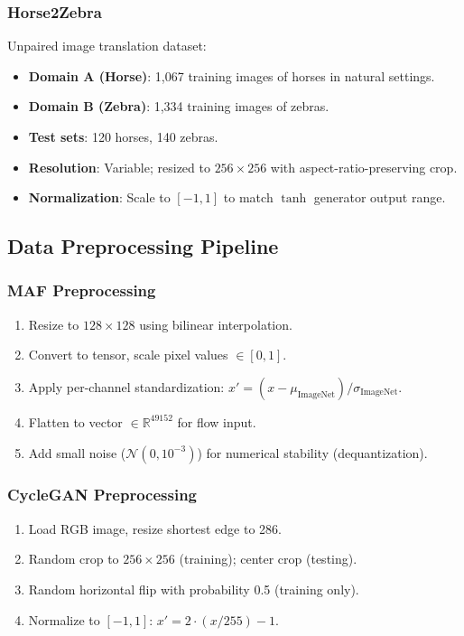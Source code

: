 \documentclass[11pt]{article}
\begin{document}
\subsubsection{Horse2Zebra}
Unpaired image translation dataset:
\begin{itemize}
\item \textbf{Domain A (Horse)}: 1,067 training images of horses in natural settings.
\item \textbf{Domain B (Zebra)}: 1,334 training images of zebras.
\item \textbf{Test sets}: 120 horses, 140 zebras.
\item \textbf{Resolution}: Variable; resized to $256 \times 256$ with aspect-ratio-preserving crop.
\item \textbf{Normalization}: Scale to $[-1, 1]$ to match $\tanh$ generator output range.
\end{itemize}

\subsection{Data Preprocessing Pipeline}
\subsubsection{MAF Preprocessing}
\begin{enumerate}
\item Resize to $128 \times 128$ using bilinear interpolation.
\item Convert to tensor, scale pixel values $\in [0, 1]$.
\item Apply per-channel standardization: $x' = (x - \mu_{\text{ImageNet}}) / \sigma_{\text{ImageNet}}$.
\item Flatten to vector $\in \mathbb{R}^{49152}$ for flow input.
\item Add small noise ($\mathcal{N}(0, 10^{-3})$) for numerical stability (dequantization).
\end{enumerate}

\subsubsection{CycleGAN Preprocessing}
\begin{enumerate}
\item Load RGB image, resize shortest edge to 286.
\item Random crop to $256 \times 256$ (training); center crop (testing).
\item Random horizontal flip with probability 0.5 (training only).
\item Normalize to $[-1, 1]$: $x' = 2 \cdot (x / 255) - 1$.
\end{enumerate}
\end{document}
